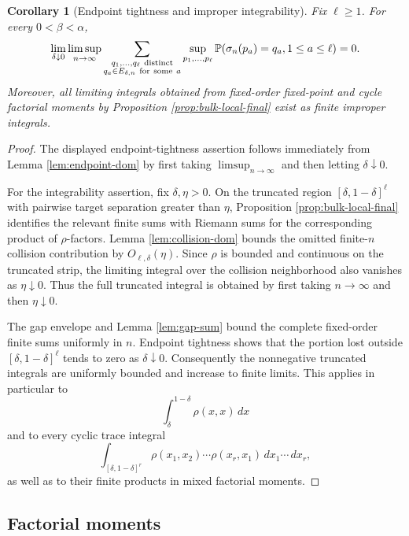 \documentclass[11pt]{article}
\newtheorem{corollary}[theorem]{Corollary}
\theoremstyle{remark}
\newcommand{\Pp}{\mathbb P}
\newcommand{\dd}{\,d}
\begin{document}
\begin{corollary}[Endpoint tightness and improper integrability]
\label{cor:endpoint-tightness}
Fix $\ell\ge1$.  For every $0<\beta<\alpha$,
\[
\lim_{\delta\downarrow0}\limsup_{n\to\infty}
\sum_{\substack{q_1,\ldots,q_\ell\ {\rm distinct}\\
q_a\in E_{\delta,n}\ {\rm for\ some}\ a}}
\sup_{p_1,\ldots,p_\ell}
\Pp(\sigma_n(p_a)=q_a,1\le a\le\ell)=0.
\]
Moreover, all limiting integrals obtained from fixed-order fixed-point and
cycle factorial moments by Proposition \ref{prop:bulk-local-final} exist as
finite improper integrals.
\end{corollary}

\begin{proof}
The displayed endpoint-tightness assertion follows immediately from Lemma
\ref{lem:endpoint-dom} by first taking $\limsup_{n\to\infty}$ and then
letting $\delta\downarrow0$.

For the integrability assertion, fix $\delta,\eta>0$.  On the truncated region
$[\delta,1-\delta]^\ell$ with pairwise target separation greater than $\eta$,
Proposition \ref{prop:bulk-local-final} identifies the relevant finite sums
with Riemann sums for the corresponding product of $\rho$-factors.  Lemma
\ref{lem:collision-dom} bounds the omitted finite-$n$ collision contribution by
$O_{\ell,\delta}(\eta)$.  Since $\rho$ is bounded and continuous on the
truncated strip, the limiting integral over the collision neighborhood also
vanishes as $\eta\downarrow0$.  Thus the full truncated integral is obtained by
first taking $n\to\infty$ and then $\eta\downarrow0$.

The gap envelope and Lemma \ref{lem:gap-sum} bound the complete fixed-order
finite sums uniformly in $n$.  Endpoint tightness shows that the portion lost
outside $[\delta,1-\delta]^\ell$ tends to zero as $\delta\downarrow0$.
Consequently the nonnegative truncated integrals are uniformly bounded and
increase to finite limits.  This applies in particular to
\[
 \int_\delta^{1-\delta}\rho(x,x)\dd x
\]
and to every cyclic trace integral
\[
 \int_{[\delta,1-\delta]^r}
 \rho(x_1,x_2)\cdots\rho(x_r,x_1)
 \dd x_1\cdots\dd x_r,
\]
as well as to their finite products in mixed factorial moments.
\end{proof}

\subsection{Factorial moments}
\end{document}
